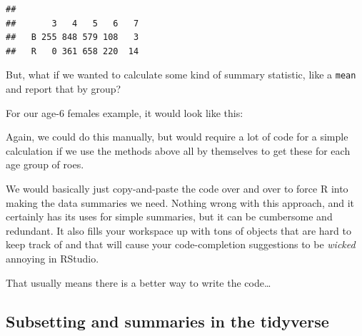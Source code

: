 \documentclass[
]{book}
\newenvironment{Shaded}{\begin{snugshade}}{\end{snugshade}}
\newcommand{\DecValTok}[1]{\textcolor[rgb]{0.00,0.00,0.81}{#1}}
\newcommand{\KeywordTok}[1]{\textcolor[rgb]{0.13,0.29,0.53}{\textbf{#1}}}
\newcommand{\NormalTok}[1]{#1}
\newcommand{\OperatorTok}[1]{\textcolor[rgb]{0.81,0.36,0.00}{\textbf{#1}}}
\newcommand{\OtherTok}[1]{\textcolor[rgb]{0.56,0.35,0.01}{#1}}
\newcommand{\StringTok}[1]{\textcolor[rgb]{0.31,0.60,0.02}{#1}}
\begin{document}
\begin{verbatim}
##    
##       3   4   5   6   7
##   B 255 848 579 108   3
##   R   0 361 658 220  14
\end{verbatim}

But, what if we wanted to calculate some kind of summary statistic, like a \texttt{mean} and report that by group?

For our age-6 females example, it would look like this:

\begin{Shaded}
\end{Shaded}

Again, we could do this manually, but would require a lot of code for a simple calculation if we use the methods above all by themselves to get these for each age group of roes.

We would basically just copy-and-paste the code over and over to force R into making the data summaries we need. Nothing wrong with this approach, and it certainly has its uses for simple summaries, but it can be cumbersome and redundant. It also fills your workspace up with tons of objects that are hard to keep track of and that will cause your code-completion suggestions to be \emph{wicked} annoying in RStudio.

That usually means there is a better way to write the code\ldots{}

\hypertarget{tidyverse}{%
\subsection{Subsetting and summaries in the tidyverse}\label{tidyverse}}
\end{document}
